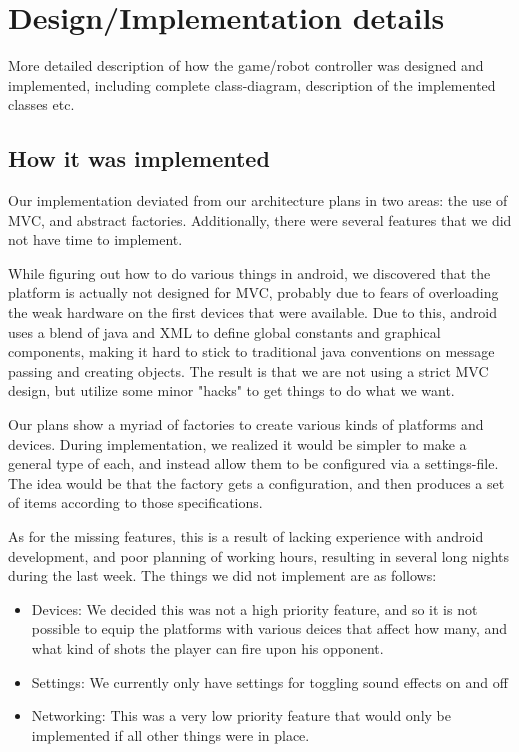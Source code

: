 \documentclass[12pt, a4paper]{article}
\begin{document}
\section{Design/Implementation details}
More detailed description of how the game/robot controller was designed and
implemented, including complete class-diagram, description of the implemented
classes etc.

\subsection{How it was implemented}

Our implementation deviated from our architecture plans in two areas: the use of
MVC, and abstract factories. Additionally, there were several features that we
did not have time to implement.

While figuring out how to do various things in android, we discovered that the
platform is actually not designed for MVC, probably due to fears of overloading
the weak hardware on the first devices that were available. Due to this, android
uses a blend of java and XML to define global constants and graphical
components, making it hard to stick to traditional java conventions on message
passing and creating objects. The result is that we are not using a strict MVC
design, but utilize some minor "hacks" to get things to do what we want.

Our plans show a myriad of factories to create various kinds of platforms and
devices. During implementation, we realized it would be simpler to make a
general type of each, and instead allow them to be configured via a
settings-file. The idea would be that the factory gets a configuration, and then
produces a set of items according to those specifications.

As for the missing features, this is a result of lacking experience with android
development, and poor planning of working hours, resulting in several long
nights during the last week. The things we did not implement are as follows:

\begin{itemize}
	\item Devices: 
		\subitem We decided this was not a high priority feature, and so it is
not possible to equip the platforms with various deices that affect how many, and what kind of
shots the player can fire upon his opponent.
	\item Settings:
		\subitem We currently only have settings for toggling sound effects on and off
	\item Networking: 
		\subitem This was a very low priority feature that would only be implemented if all other
things were in place.
\end{itemize}
\end{document}
